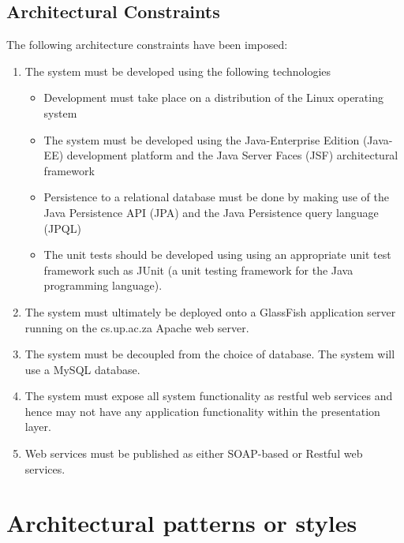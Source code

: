 \documentclass[12pt, oneside]{article}
\begin{document}
	\subsection{Architectural Constraints}		
	The following architecture constraints have been imposed:
\begin{enumerate}
	\item The system must be developed using the following technologies
	\begin{itemize}
		\item Development must take place on a distribution of the Linux operating system
		\item The system must be developed using the Java-Enterprise Edition (Java-EE) development platform and the Java Server Faces (JSF) architectural framework
		\item Persistence to a relational database must be done by making use of the Java Persistence API (JPA) and the Java Persistence query language (JPQL)
		\item The unit tests should be developed using using an appropriate unit test framework such as JUnit (a unit testing framework for the Java programming language).
	\end{itemize}

	\item The system must ultimately be deployed onto a GlassFish application server running on the cs.up.ac.za Apache web server.
	\item The system must be decoupled from the choice of database. The system will use a MySQL database.
	\item The system must expose all system functionality as restful web services and hence may not have any application functionality within the presentation layer.
	\item Web services must be published as either SOAP-based or Restful web services.
\end{enumerate}
\section{Architectural patterns or styles}
\end{document}

